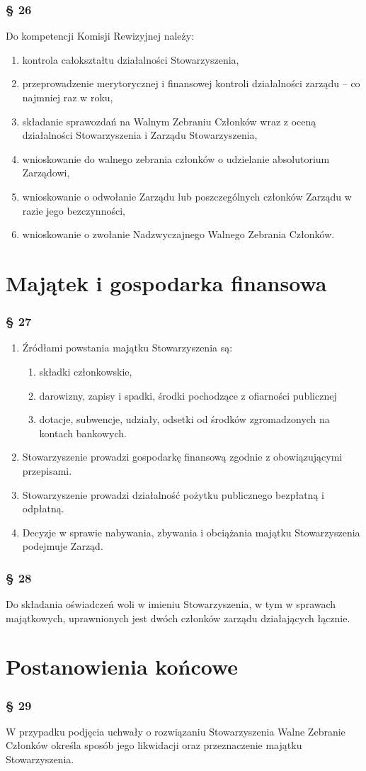 \documentclass{article}
\newcommand{\myparagraph}[1]{\subsubsection*{#1}}
\begin{document}
\myparagraph{§ 26}
Do kompetencji Komisji Rewizyjnej należy:
\begin{enumerate}
\item
  kontrola całokształtu działalności Stowarzyszenia,
\item
  przeprowadzenie merytorycznej i finansowej kontroli działalności zarządu -- co najmniej raz w roku,
\item
  składanie sprawozdań na Walnym Zebraniu Członków wraz z oceną działalności Stowarzyszenia i Zarządu Stowarzyszenia,
\item
  wnioskowanie do walnego zebrania członków o udzielanie absolutorium Zarządowi,
\item
  wnioskowanie o odwołanie Zarządu lub poszczególnych członków Zarządu w razie jego bezczynności,
\item
  wnioskowanie o zwołanie Nadzwyczajnego Walnego Zebrania Członków.
\end{enumerate}

\section{Majątek i gospodarka finansowa}
\myparagraph{§ 27}
\begin{enumerate}
\item
  Źródłami powstania majątku Stowarzyszenia są:
  \begin{enumerate}
  \def\labelenumii{\alph{enumii}.}
  \item
    składki członkowskie,
  \item
    darowizny, zapisy i spadki, środki pochodzące z ofiarności publicznej
  \item
    dotacje, subwencje, udziały, odsetki od środków zgromadzonych na kontach bankowych.
  \end{enumerate}
\item
  Stowarzyszenie prowadzi gospodarkę finansową zgodnie z obowiązującymi przepisami.
\item
  Stowarzyszenie prowadzi działalność pożytku publicznego bezpłatną i odpłatną.
\item
  Decyzje w sprawie nabywania, zbywania i obciążania majątku Stowarzyszenia podejmuje Zarząd.
\end{enumerate}

\myparagraph{§ 28}
Do składania oświadczeń woli w imieniu Stowarzyszenia, w tym w sprawach majątkowych, uprawnionych jest dwóch członków zarządu działających łącznie.

\section{Postanowienia końcowe}
\myparagraph{§ 29}
W przypadku podjęcia uchwały o rozwiązaniu Stowarzyszenia Walne Zebranie Członków określa sposób jego likwidacji oraz przeznaczenie majątku Stowarzyszenia.
\end{document}
